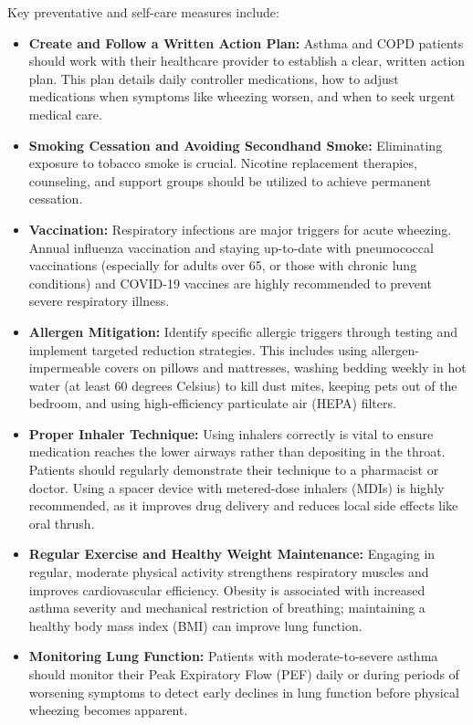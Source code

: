 Key preventative and self-care measures include:
\begin{itemize}
    \item \textbf{Create and Follow a Written Action Plan:} Asthma and COPD patients should work with their healthcare provider to establish a clear, written action plan. This plan details daily controller medications, how to adjust medications when symptoms like wheezing worsen, and when to seek urgent medical care.
    \item \textbf{Smoking Cessation and Avoiding Secondhand Smoke:} Eliminating exposure to tobacco smoke is crucial. Nicotine replacement therapies, counseling, and support groups should be utilized to achieve permanent cessation.
    \item \textbf{Vaccination:} Respiratory infections are major triggers for acute wheezing. Annual influenza vaccination and staying up-to-date with pneumococcal vaccinations (especially for adults over 65, or those with chronic lung conditions) and COVID-19 vaccines are highly recommended to prevent severe respiratory illness.
    \item \textbf{Allergen Mitigation:} Identify specific allergic triggers through testing and implement targeted reduction strategies. This includes using allergen-impermeable covers on pillows and mattresses, washing bedding weekly in hot water (at least 60 degrees Celsius) to kill dust mites, keeping pets out of the bedroom, and using high-efficiency particulate air (HEPA) filters.
    \item \textbf{Proper Inhaler Technique:} Using inhalers correctly is vital to ensure medication reaches the lower airways rather than depositing in the throat. Patients should regularly demonstrate their technique to a pharmacist or doctor. Using a spacer device with metered-dose inhalers (MDIs) is highly recommended, as it improves drug delivery and reduces local side effects like oral thrush.
    \item \textbf{Regular Exercise and Healthy Weight Maintenance:} Engaging in regular, moderate physical activity strengthens respiratory muscles and improves cardiovascular efficiency. Obesity is associated with increased asthma severity and mechanical restriction of breathing; maintaining a healthy body mass index (BMI) can improve lung function.
    \item \textbf{Monitoring Lung Function:} Patients with moderate-to-severe asthma should monitor their Peak Expiratory Flow (PEF) daily or during periods of worsening symptoms to detect early declines in lung function before physical wheezing becomes apparent.
\end{itemize}

